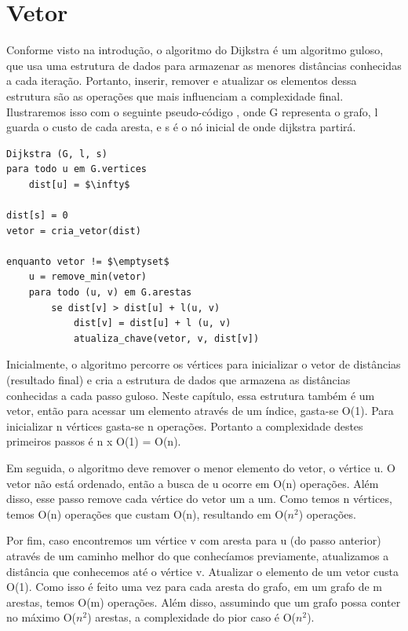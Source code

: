 \documentclass[
	12pt,				%
	oneside,			%
	a4paper,			%
	english,			%
	french,				%
	spanish,			%
	brazil,				%
	]{abntex2}
\begin{document}
\section{Vetor}
Conforme visto na introdução, o algoritmo do Dijkstra é um algoritmo guloso, que usa uma estrutura de dados para armazenar as menores distâncias conhecidas a cada iteração. Portanto, inserir, remover e atualizar os elementos dessa estrutura são as operações que mais influenciam a complexidade final. Ilustraremos isso com o seguinte pseudo-código \cite{dasgupta2006}, onde \textsf{G} representa o grafo, \textsf{l} guarda o custo de cada aresta, e \textsf{s} é o nó inicial de onde dijkstra partirá.

\begin{lstlisting}[mathescape=true, label=dijkstra.pseudo.vetor]
Dijkstra (G, l, s)
para todo u em G.vertices
    dist[u] = $\infty$
    
dist[s] = 0
vetor = cria_vetor(dist)       

enquanto vetor != $\emptyset$
    u = remove_min(vetor)
    para todo (u, v) em G.arestas
        se dist[v] > dist[u] + l(u, v)
            dist[v] = dist[u] + l (u, v)
            atualiza_chave(vetor, v, dist[v])
\end{lstlisting}

Inicialmente, o algoritmo percorre os vértices para inicializar o vetor de distâncias (resultado final) e cria a estrutura de dados que armazena as distâncias conhecidas a cada passo guloso. Neste capítulo, essa estrutura também é um vetor, então para acessar um elemento através de um índice, gasta-se \textsf{O(1)}. Para inicializar n vértices gasta-se n operações. Portanto a complexidade destes primeiros passos é \textsf{n} x \textsf{O(1)} = \textsf{O(n)}.

Em seguida, o algoritmo deve remover o menor elemento do vetor, o vértice \textsf{u}. O vetor não está ordenado, então a busca de \textsf{u} ocorre em \textsf{O(n)} operações. Além disso, esse passo remove cada vértice do vetor um a um. Como temos n vértices, temos \textsf{O(n)} operações que custam \textsf{O(n)}, resultando em \textsf{O($n^2$)} operações.

Por fim, caso encontremos um vértice \textsf{v} com aresta para \textsf{u} (do passo anterior) através de um caminho melhor do que conhecíamos previamente, atualizamos a distância que conhecemos até o vértice \textsf{v}. Atualizar o elemento de um vetor custa O(1). Como isso é feito uma vez para cada aresta do grafo, em um grafo de m arestas, temos \textsf{O(m)} operações. Além disso, assumindo que um grafo possa conter no máximo O($n^2$) arestas, a complexidade do pior caso é \textsf{O($n^2$)}.
\end{document}

